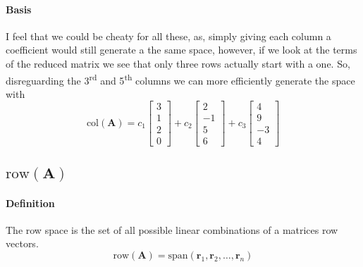 \documentclass{article}
\begin{document}
            \paragraph{Basis}
                I feel that we could be cheaty for all these, as, simply giving each column a coefficient
                would still generate a the same space, however, if we look at the terms of the reduced matrix
                we see that only three rows actually start with a one. So, disreguarding the 3\textsuperscript{rd} and 5\textsuperscript{th}
                columns we can more efficiently generate the space with
                \[
                    \text{col}(\mathbf{A})=c_1\begin{bmatrix}3\\1\\2\\0\end{bmatrix}+c_2\begin{bmatrix}2\\-1\\5\\6\end{bmatrix}+c_3\begin{bmatrix}4\\9\\-3\\4\end{bmatrix}
                \]
        \subsection[The row space of A]{$\text{row}(\mathbf{A})$}
            \paragraph{Definition}
                The row space is the set of all possible linear combinations of a matrices row vectors.
                \[
                    \text{row}(\mathbf{A})=\text{span}(\mathbf{r}_1,\mathbf{r}_2,\dots,\mathbf{r}_n)
                \]
\end{document}

